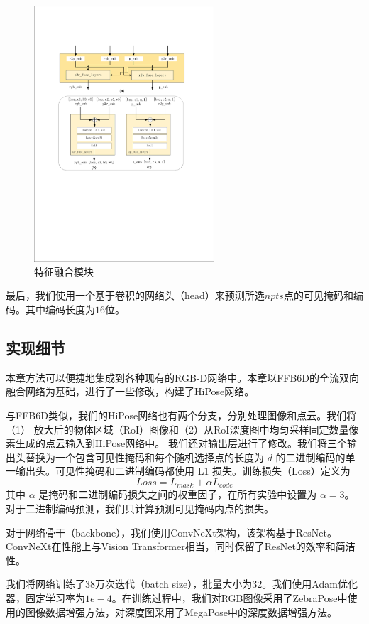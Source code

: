 \begin{figure}[htbp]
    \centering
    \includegraphics[width=0.6\textwidth]{figure/hipose/fuse.pdf}
    \caption{特征融合模块}
    \label{fig:fuse}
\end{figure}


最后，我们使用一个基于卷积的网络头（head）来预测所选$npts$点的可见掩码和编码。其中编码长度为$16$位。

\subsection{实现细节}\label{subsection:implementation_details}
本章方法可以便捷地集成到各种现有的RGB-D网络中。本章以FFB6D\cite{he2021ffb6d}的全流双向融合网络为基础，进行了一些修改，构建了HiPose网络。

与FFB6D类似，我们的HiPose网络也有两个分支，分别处理图像和点云。我们将（1） 放大后的物体区域（RoI）图像和（2）从RoI深度图中均匀采样固定数量像素生成的点云输入到HiPose网络中。
我们还对输出层进行了修改。我们将三个输出头替换为一个包含可见性掩码和每个随机选择点的长度为 $d$ 的二进制编码的单一输出头。可见性掩码和二进制编码都使用 L1 损失。训练损失（Loss）定义为
\begin{equation}
Loss = L_{mask} + \alpha L_{code}   
\end{equation}
其中 $\alpha$ 是掩码和二进制编码损失之间的权重因子，在所有实验中设置为 $\alpha = 3$。对于二进制编码预测，我们只计算预测可见掩码内点的损失。

对于网络骨干（backbone），我们使用ConvNeXt\cite{Liu2022ACF}架构，该架构基于ResNet\cite{He2015DeepRL}。ConvNeXt在性能上与Vision Transformer\cite{Dosovitskiy2020AnII}相当，同时保留了ResNet的效率和简洁性。

我们将网络训练了$38$万次迭代（batch size），批量大小为$32$。我们使用Adam\cite{Kingma2014AdamAM}优化器，固定学习率为$1e-4$。在训练过程中，我们对RGB图像采用了ZebraPose\cite{su2022zebrapose}中使用的图像数据增强方法，对深度图采用了MegaPose\cite{Labbe2022MegaPose6P}中的深度数据增强方法。


